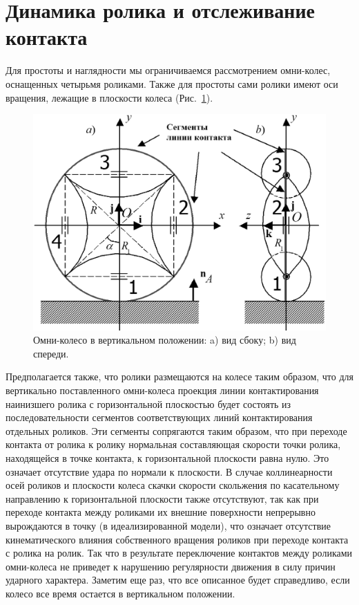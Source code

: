 \section{Динамика ролика и отслеживание контакта}

Для простоты и наглядности мы ограничиваемся рассмотрением омни-колес, 
оснащенных четырьмя роликами. Также для простоты сами ролики имеют оси 
вращения, лежащие в плоскости колеса (Рис.~\ref{OmniWheel}).

\begin{figure}[htb]
\centering\includegraphics[width=13cm]{content/parts/3_friction/nd/OmniWheel.eps}
\caption{Омни-колесо в вертикальном положении: a) вид сбоку; b) вид спереди.}
\label{OmniWheel}
\end{figure}

Предполагается также, что ролики размещаются на колесе таким образом, что для 
вертикально поставленного омни-колеса проекция линии контактирования наинизшего 
ролика с горизонтальной плоскостью будет состоять из последовательности 
сегментов соответствующих линий контактирования отдельных роликов. Эти сегменты 
сопрягаются таким образом, что при переходе контакта от ролика к ролику 
нормальная составляющая скорости точки ролика, находящейся в точке контакта, к 
горизонтальной плоскости равна нулю. Это означает отсутствие удара по нормали к 
плоскости. В случае коллинеарности осей роликов и плоскости колеса скачки 
скорости скольжения по касательному направлению к горизонтальной плоскости 
также отсутствуют, так как при переходе контакта между роликами их внешние 
поверхности непрерывно вырождаются в точку (в идеализированной модели), что 
означает отсутствие кинематического влияния собственного вращения роликов при 
переходе контакта с ролика на ролик. Так что в результате переключение 
контактов между роликами омни-колеса не приведет к нарушению регулярности 
движения в силу причин ударного характера. Заметим еще раз, что все описанное 
будет справедливо, если колесо все время остается в вертикальном положении.

